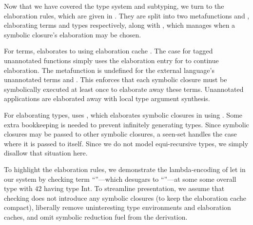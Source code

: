 Now that we have covered the type system and subtyping, we turn to the elaboration rules,
which are given in .
They are split into two metafunctions \ltielimClossymbol and \ltielimClosTsymbol,
elaborating terms and types respectively, along with
\ltiupdateClosureCacheSinglesymbol, which manages when a symbolic closure's elaboration may
be chosen.

For terms, \ltielimClos{\ltiClosureCache{}}{\ltiE{}}{\ltiEp{}}
elaborates \ltiE{} to \ltiEp{} using elaboration cache \ltiClosureCache{}.
The case for tagged unannotated functions 
{\ltiufunelab{\ltiufunelabentry{\ltiClosureID{}}}
                                  {\ltivar{}}
                                  {\ltiE{}}}
simply uses the elaboration entry for \ltiClosureID{} to continue elaboration.
The metafunction is undefined for the external language's unannotated terms
\ltiufun{\ltivar{}}{\ltiE{}} and \ltiapp{\ltiF{}}{\ltiE{}}.
This enforces that each symbolic closure must be symbolically executed at least once
to elaborate away these terms.
Unannotated applications \ltiapp{\ltiF{}}{\ltiE{}}
are elaborated away with local type argument synthesis.

For elaborating types, \ltielimClossymbol
uses \ltielimClosT{\ova{\ltiClosureID{}}}{\ltiClosureCache{}}{\ltiT{}}{\ltiTp{}}, which
elaborates symbolic closures in \ltiT{} using \ltiClosureCache{}.
Some extra bookkeeping is needed to prevent infinitely generating
types. Since symbolic closures may be passed to other symbolic closures,
a seen-set \ova{\ltiClosureID{}} handles the case where it is passed to itself.
Since we do not model equi-recursive types, we simply disallow that situation here.

To highlight the elaboration rules,
we demonstrate the lambda-encoding of let in our system by
checking term ``''---which desugars to
``{}''---at some
some overall type \ltiS{}
with $\text{42}$ having type $\text{Int}$.
To streamline presentation, we assume that checking \ltiF{}
does not introduce any symbolic closures
(to keep the elaboration cache compact), liberally
remove uninteresting type environments and elaboration caches,
and omit symbolic reduction fuel from the derivation.


